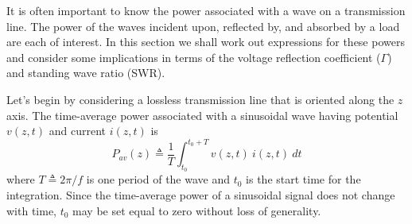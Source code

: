 

\label{m0090_Power_Flow_on_Transmission_Lines} %

It is often important to know the power associated with a wave on a transmission line.
The power of the waves incident upon, reflected by, and absorbed by a load are each of interest.
In this section we shall work out expressions for these powers and consider some implications in terms of the voltage reflection coefficient ($\Gamma$) and standing wave ratio (SWR).
  
Let's begin by considering a lossless transmission line that is oriented along the $z$ axis.
The time-average power associated with a sinusoidal wave having potential $v(z,t)$ and current $i(z,t)$ is
%
\begin{equation}
P_{av}(z) \triangleq \frac{1}{T}\int_{t_0}^{t_0+T}{ v(z,t)~i(z,t)~dt }
\end{equation} 
%
where $T\triangleq 2\pi/f$ is one period of the wave and $t_0$ is the start time for the integration.
Since the time-average power of a sinusoidal signal does not change with time, $t_0$ may be set equal to zero without loss of generality. 

